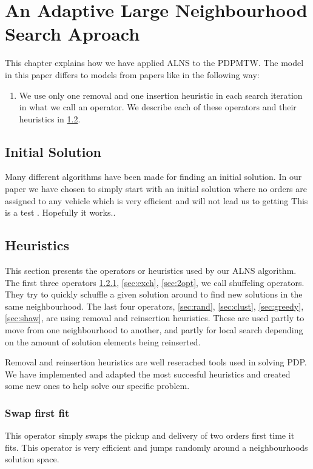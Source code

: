 \documentclass[../main.tex]{subfiles}
\begin{document}
                                                
\chapter{An Adaptive Large Neighbourhood Search Aproach}
\label{ch:appr}
This chapter explains how we have applied ALNS to the PDPMTW. The model in this paper differs to models from papers like \cite{ropke06} in the following way:
\begin{enumerate}
    \item We use only one removal and one insertion heuristic in each search iteration in what we call an operator. We describe each of these operators and their heuristics in \ref{sec:oper}.
\end{enumerate}
\section{Initial Solution}
\label{sec:init}
Many different algorithms have been made for finding an initial solution. In our paper we have chosen to simply start with an initial solution where no orders are assigned to any vehicle which is very efficient and will not lead us to getting 
This is a test \cite{shaw97}. Hopefully it works..              

\section{Heuristics}
\label{sec:oper}
This section presents the operators or heuristics used by our ALNS algorithm.
The first three operators \ref{sec:swap}, \ref{sec:exch}, \ref{sec:2opt}, we call shuffeling operators. They try to quickly schuffle a given solution around to find new solutions in the same neighbourhood.
The last four operators, \ref{sec:rand}, \ref{sec:clust}, \ref{sec:greedy}, \ref{sec:shaw}, are using removal and reinsertion heuristics. These are used partly to move from one neighbourhood to another, and partly for local search depending on the  amount of solution elements being reinserted.  

Removal and reinsertion heuristics are well reserached tools used in solving PDP. 
We have implemented and adapted the most succesful heuristics and created some new ones to help solve our specific problem. 

\subsection{Swap first fit}
\label{sec:swap}
This operator simply swaps the pickup and delivery of two orders first time it fits. 
This operator is very efficient and jumps randomly around a neighbourhoods solution space.
\end{document}
